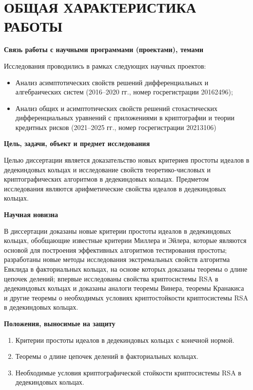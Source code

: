 \documentclass[_00_autoref.tex]{subfiles}
\begin{document}
{\let\clearpage\relax\vspace{2.2ex}
\chapter*{\MakeUppercase{ОБЩАЯ ХАРАКТЕРИСТИКА РАБОТЫ}}\vspace{-2ex}}

\medskip
\centerline{\textbf{Связь работы с научными программами (проектами), темами}}

Исследования проводились в рамках следующих научных проектов:
\begin{itemize}
    \item Анализ асимптотических свойств решений дифференциальных и алгебраических систем (2016--2020 гг., номер госрегистрации 20162496);

    \item Анализ общих и асимптотических свойств решений стохастических дифференциальных уравнений с приложениями в криптографии и теории кредитных рисков (2021--2025 гг., номер госрегистрации 20213106)
\end{itemize}

\medskip
\centerline{\textbf{Цель, задачи, объект и предмет исследования}}

Целью диссертации является доказательство новых критериев простоты идеалов в дедекиндовых кольцах и исследование свойств теоретико-числовых и криптографических алгоритмов в дедекиндовых кольцах.
Предметом исследования являются арифметические свойства идеалов в дедекиндовых кольцах.

\medskip
\centerline{\textbf{Научная новизна}}

В диссертации доказаны новые критерии простоты идеалов в дедекиндовых кольцах, обобщающие известные критерии Миллера и Эйлера, которые являются основой для построения эффективных алгоритмов тестирования простоты;
разработаны новые методы исследования экстремальных свойств алгоритма Евклида в факториальных кольцах, на основе которых доказаны теоремы о длине цепочек делений;
впервые исследованы свойства криптосистемы RSA в дедекиндовых кольцах и доказаны аналоги теоремы Винера, теоремы Кранакиса и другие теоремы о необходимых условиях криптостойкости криптосистемы RSA в дедекиндовых кольцах.

\medskip
\centerline{\textbf{Положения, выносимые на защиту}}

\begin{enumerate}
    \item Критерии простоты идеалов в дедекиндовых кольцах с конечной нормой.
    
    \item Теоремы о длине цепочек делений в факториальных кольцах.
    
    \item Необходимые условия криптографической стойкости криптосистемы RSA в дедекиндовых кольцах.
\end{enumerate}
\end{document}
